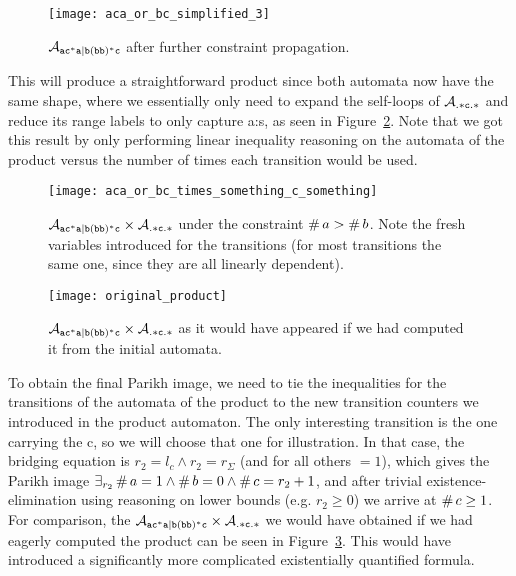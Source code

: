 \documentclass[acmsmall,review,anonymous]{acmart}\settopmatter{printfolios=true,printccs=false,printacmref=true}
\theoremstyle{definition}
\begin{document}
  \begin{figure}[h]
    \centering 
      \texttt{[image: aca\_or\_bc\_simplified\_3]}
      \caption{$\mathcal{A}_{\mathtt{ac^*a|b(bb)^*c}}{}$ after further constraint propagation.}\label{fig:example-simplify-3}
    \end{figure}

This will produce a straightforward product since both automata now have the
same shape, where we essentially only need to expand the self-loops of
$\mathcal{A}_{\mathtt{.*c.*}}$ and reduce its range labels to only capture a:s, as seen
in Figure~\ref{fig:final-example}. Note that we got this result by only
performing linear inequality reasoning on the automata of the product versus the
number of times each transition would be used.

\begin{figure}[h]
\centering
    \texttt{[image: aca\_or\_bc\_times\_something\_c\_something]}
    \caption{$\mathcal{A}_{\mathtt{ac^*a|b(bb)^*c}}{} \times \mathcal{A}_{\mathtt{.*c.*}}{}$ under the constraint
    $\operatorname{\#}{a} > \operatorname{\#}{b}$. Note the fresh variables
    introduced for the transitions (for most transitions the same one, since
    they are all linearly dependent).}\label{fig:final-example}
  \end{figure}


  \begin{figure}[h]
\centering
    \texttt{[image: original\_product]}
    \caption{$\mathcal{A}_{\mathtt{ac^*a|b(bb)^*c}}{} \times \mathcal{A}_{\mathtt{.*c.*}}{}$ as it would have
    appeared if we had computed it from the initial
    automata.}\label{fig:original-product}
  \end{figure}


To obtain the final Parikh image, we need to tie the inequalities for the
transitions of the automata of the product to the new transition counters we
introduced in the product automaton. The only interesting transition is the one
carrying the c, so we will choose that one for illustration. In that case, the
bridging equation is $r_2 = l_c \land r_2 = r_{\Sigma}$ (and for all others
$=1$), which gives the Parikh image $\exists_{r_2} \operatorname{\#}{a} = 1 \land
\operatorname{\#}{b} = 0 \land \operatorname{\#}{c} = r_2 + 1$, and after trivial
existence-elimination using reasoning on lower bounds (e.g. $r_2 \geq 0$) we
arrive at $\operatorname{\#}{c} \geq 1$. For comparison, the $\mathcal{A}_{\mathtt{ac^*a|b(bb)^*c}}{} \times
\mathcal{A}_{\mathtt{.*c.*}}{}$ we would have obtained if we had eagerly computed the
product can be seen in Figure~\ref{fig:original-product}. This would have
introduced a significantly more complicated existentially quantified formula.
\end{document}
